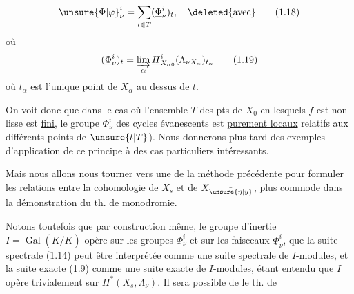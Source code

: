 \[
{\unsure{\Phi|\varphi}}^i_\nu=\sum_{t\in T}(\underline\Phi^i_\nu)_t,\quad\deleted{\text{avec}}
\tag*{(1.18)}
\]
où
\[
(\underline\Phi^i_\nu)_t=\varinjlim_\alpha\underline H^i_{X_{\alpha0}}(\Lambda_{\nu X_\alpha})_{t_\alpha}
\tag*{(1.19)}
\]
où $t_\alpha$ est l'unique point de $X_\alpha$ au dessus de $t$.

On voit donc que dans le cas où l'ensemble $T$ des pts de $X_0$ en lesquels $f$ est non lisse est \uline{fini}, le  groupe $\Phi^i_\nu$ des cycles évanescents est  \uline{purement locaux}  relatifs aux différents points de $\unsure{t|T}$).  Nous donnerons plus tard des exemples  d'application de ce principe à des cas particuliers intéressants.

 Mais nous allons nous tourner  vers une   de la méthode précédente pour  formuler les relations entre la cohomologie de  $X_s$ et de $X_{\bar{\unsure{\eta|y}}}$,  plus commode dans la démonstration du th. de monodromie.

Notons toutefois  que  par construction même, le  groupe d'inertie $I=\operatorname{Gal}(\bar K/K)$ opère sur les groupes $\Phi^i_\nu$ et  sur les faisceaux $\underline\Phi^i_\nu$, que la suite spectrale (1.14) peut être interprétée comme une suite spectrale de $I$-modules, et la suite exacte (1.9) comme une suite exacte de $I$-modules, étant entendu que $I$ opère trivialement sur $H^*(X_s,\Lambda_\nu)$.  Il sera possible de  le th. de
